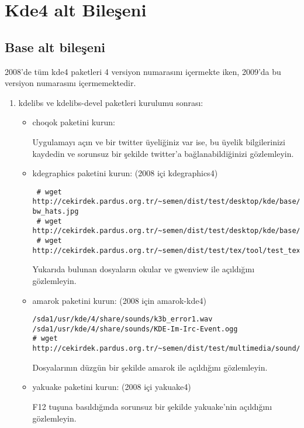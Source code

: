 \documentclass[a4paper,10pt]{article}
\begin{document}
\section{Kde4 alt Bileşeni}
\subsection*{Base alt bileşeni}

2008'de tüm kde4 paketleri 4 versiyon numarasını içermekte iken, 2009'da bu versiyon numarasını içermemektedir.
\begin{enumerate} 
 \item kdelibs ve kdelibs-devel paketleri kurulumu sonrası:
\begin{itemize}
 \item choqok paketini kurun: 

Uygulamayı açın ve bir twitter üyeliğiniz var ise, bu üyelik bilgilerinizi kaydedin ve sorunsuz bir şekilde twitter'a bağlanabildiğinizi gözlemleyin.
 \item kdegraphics paketini kurun: (2008 içi kdegraphics4)
\begin{verbatim}
 # wget http://cekirdek.pardus.org.tr/~semen/dist/test/desktop/kde/base/circus-bw_hats.jpg
 # wget http://cekirdek.pardus.org.tr/~semen/dist/test/desktop/kde/base/tepecik_01.png
 # wget http://cekirdek.pardus.org.tr/~semen/dist/test/tex/tool/test_texlivelatex.dvi
\end{verbatim}
Yukarıda bulunan dosyaların okular ve gwenview ile açıldığını gözlemleyin.
\item amarok paketini kurun: (2008 için amarok-kde4) 

\begin{verbatim}
/sda1/usr/kde/4/share/sounds/k3b_error1.wav
/sda1/usr/kde/4/share/sounds/KDE-Im-Irc-Event.ogg
# wget http://cekirdek.pardus.org.tr/~semen/dist/test/multimedia/sound/music.mp3
\end{verbatim}

Dosyalarının düzgün bir şekilde amarok ile açıldığını gözlemleyin.

\item yakuake paketini kurun: (2008 içi yakuake4)

F12 tuşuna basıldığında sorunsuz bir şekilde yakuake'nin açıldığını gözlemleyin.
\end{itemize}

\end{enumerate}
\end{document}
